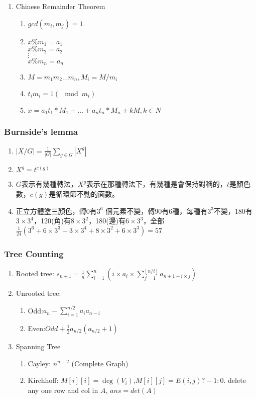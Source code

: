 \begin{enumerate}
\item{Chinese Remainder Theorem}
\begin{enumerate}\itemsep = -3pt
\item $gcd(m_i, m_j) = 1$
\item
$x \% m_1 = a_1$\\
$x \% m_2 = a_2$\\
$\vdots$ \\
$x \% m_n = a_n$
\item $M = m_1 m_2 \dots m_n, M_i = M / m_i$
\item $t_i m_i = 1 (\mod m_i)$
\item $x = a_1 t_1 * M_1 + \dots + a_n t_n * M_n + k M, k \in N$
\end{enumerate}

\end{enumerate}


\subsubsection{Burnside's lemma}
\begin{enumerate}\itemsep = -3pt
	\item $|X/G| = \frac{1}{|G|}\sum_{g \in G}|X^g|$
	\item $X^g=t^{c(g)}$
	\item $G$表示有幾種轉法，$X^g$表示在那種轉法下，有幾種是會保持對稱的，$t$是顏色數，$c(g)$是循環節不動的面數。
	\item 正立方體塗三顏色，轉0有$3^6$ 個元素不變，轉90有6種，每種有$3^3$不變，180有$3\times 3^4$，120(角)有$8\times 3^2$，180(邊)有$6\times 3^3$，全部$\frac{1}{24}\left(3^6+6\times 3^3 + 3 \times 3^4 + 8 \times 3^2 + 6 \times 3^3 \right) = 57$
\end{enumerate}

\subsubsection{Tree Counting}
\begin{enumerate}\itemsep = -3pt
	\item Rooted tree: $s_{n+1}=\frac{1}{n}\sum_{i=1}^{n}(i\times a_i\times \sum_{j=1}^{\left \lfloor  n/i\right \rfloor} a_{n+1-i\times j})$
	\item Unrooted tree: 
	\begin{enumerate}\itemsep = -2pt
		\item Odd:$a_n-\sum_{i=1}^{n/2}a_ia_{n-i}$
		\item Even:$Odd+\frac{1}{2}a_{n/2}(a_{n/2}+1)$
	\end{enumerate}
	\item Spanning Tree
	\begin{enumerate}\itemsep = -2pt
		\item Cayley: $n^{n-2}$ (Complete Graph)
		\item Kirchhoff: $M[i][i]=\deg(V_i)$,$M[i][j]= E(i,j) ? -1 : 0$. delete any one row and col in $A$, $ans = det(A)$
	\end{enumerate}
\end{enumerate}

%